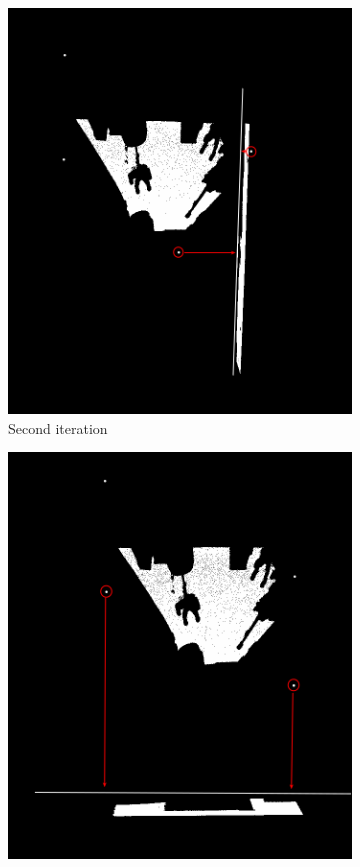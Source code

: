 \begin{figure}[p]
\begin{subfigure}[b]{0.49\linewidth}
					\includegraphics[width=1\linewidth]{"Includes/images/Project Points/F-2"} 
					\caption{Second iteration} 
					\label{fig4Adjust:b} 
					\vspace{4ex}
				\end{subfigure} 
				\begin{subfigure}[b]{0.49\linewidth}
					\centering
					\includegraphics[width=1\linewidth]{"Includes/images/Project Points/F-3"} 

\end{subfigure}
\end{figure}
